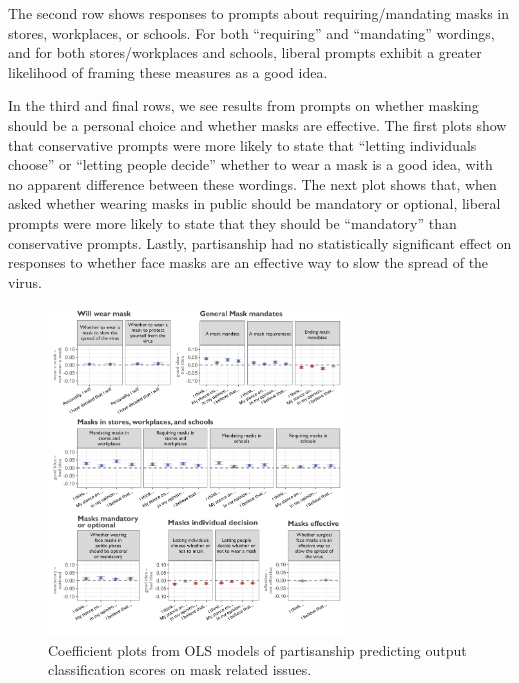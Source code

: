 \documentclass{article}
\begin{document}
The second row shows responses to prompts about requiring/mandating
masks in stores, workplaces, or schools. For both ``requiring'' and
``mandating'' wordings, and for both stores/workplaces and schools,
liberal prompts exhibit a greater likelihood of framing these measures
as a good idea.

In the third and final rows, we see results from prompts on whether
masking should be a personal choice and whether masks are effective. The
first plots show that conservative prompts were more likely to state
that ``letting individuals choose'' or ``letting people decide'' whether
to wear a mask is a good idea, with no apparent difference between these
wordings. The next plot shows that, when asked whether wearing masks in
public should be mandatory or optional, liberal prompts were more likely
to state that they should be ``mandatory'' than conservative prompts.
Lastly, partisanship had no statistically significant effect on
responses to whether face masks are an effective way to slow the spread
of the virus.

\begin{figure}[!htbp]
  \captionsetup{justification=raggedright,singlelinecheck=false}
  \caption{Coefficient plots from OLS models of partisanship predicting output classification scores on mask related issues.}
  \label{fig:partisan2}
  \centering
  \includegraphics[width=0.7\textwidth]{./figures/media/image15.png}
\end{figure}
\end{document}
